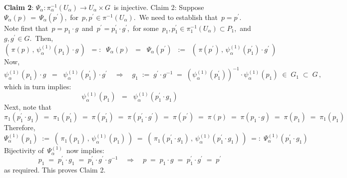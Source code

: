 \vskip 0.5cm
\noindent
\textbf{Claim 2}:\quad
$\Psi_{\alpha} : \pi_{\alpha}^{-1}(U_{\alpha}) \longrightarrow U_{\alpha} \times G$\, is injective.
\vskip 0.2cm
\proofof Claim 2:\quad
Suppose \,$\Psi_{\alpha}(p) \,=\, \Psi_{\alpha}(p^{\prime})$,\, for \,$p, p^{\prime} \in \pi^{-1}(U_{\alpha})$.\,
We need to establish that \,$p = p^{\prime}$.\,
Note first that \,$p = p_{1} \cdot g$\, and \,$p^{\prime} = p_{1}^{\prime} \cdot g^{\prime}$,\,
for some
\,$p_{1}, p_{1}^{\prime} \in \pi_{1}^{-1}(U_{\alpha}) \subset P_{1}$,\, and
\,$g, g^{\prime} \in G$.\,
Then,
\begin{equation*}
\left(\,\pi(p)\,,\,\psi^{(1)}_{\alpha}(p_{1}) \cdot g\,\right)
\;\; =: \;\;
	\Psi_{\alpha}(p)
\;\; = \;\;
	\Psi_{\alpha}(p^{\prime})
\;\; := \;\;
	\left(\,\pi(p^{\prime})\,,\,\psi^{(1)}_{\alpha}(p_{1}^{\prime}) \cdot g^{\prime}\,\right)
\end{equation*}
Now,
\begin{equation*}
\psi^{(1)}_{\alpha}(p_{1}) \cdot g
\;\; = \;\;
	\psi^{(1)}_{\alpha}(p_{1}^{\prime}) \cdot g^{\prime}
\quad \Longrightarrow \quad
g_{1}
\; := \;
	g^{\prime} \cdot g^{-1}
\; = \;
	\left(\psi^{(1)}_{\alpha}(p_{1}^{\prime})\right)^{-1} \cdot \psi^{(1)}_{\alpha}(p_{1})
\; \in \;
	G_{1}
\; \subset \;
	G\,,
\end{equation*}
which in turn implies:
\begin{equation*}
\psi^{(1)}_{\alpha}(p_{1})
\;\; = \;\;
	\psi^{(1)}_{\alpha}(p_{1}^{\prime} \cdot g_{1})
\end{equation*}
Next, note that
\begin{equation*}
\pi_{1}(p_{1}^{\prime} \cdot g_{1})
\; = \;
	\pi_{1}(p_{1}^{\prime})
\; = \;
	\pi(p_{1}^{\prime})
\; = \;
	\pi(p_{1}^{\prime} \cdot g^{\prime})
\; = \;
	\pi(p^{\prime})
\; = \;
	\pi(p)
\; = \;
	\pi(p_{1} \cdot g)
\; = \;
	\pi(p_{1})
\; = \;
	\pi_{1}(p_{1})
\end{equation*}
Therefore,
\begin{equation*}
\Psi^{(1)}_{\alpha}(p_{1})
\; := \;
	\left(\,\pi_{1}(p_{1})\,,\,\psi^{(1)}_{\alpha}(p_{1})\,\right)
\; = \;
	\left(\,\pi_{1}(p_{1}^{\prime} \cdot g_{1})\,,\,\psi^{(1)}_{\alpha}(p_{1}^{\prime} \cdot g_{1})\,\right)
\; =: \;
	\Psi^{(1)}_{\alpha}(p_{1}^{\prime} \cdot g_{1})
\end{equation*}
Bijectivity of \,$\Psi^{(1)}_{\alpha}$\, now implies:
\begin{equation*}
p_{1}
\; = \;
	p_{1}^{\prime} \cdot g_{1}
\; = \;
	p_{1}^{\prime} \cdot g^{\prime} \cdot g^{-1}
\quad \Longrightarrow \quad
p
\; = \;
	p_{1} \cdot g
\; = \;
	p_{1}^{\prime} \cdot g^{\prime}
\; = \;
	p^{\prime}
\end{equation*}
as required. This proves Claim 2.

